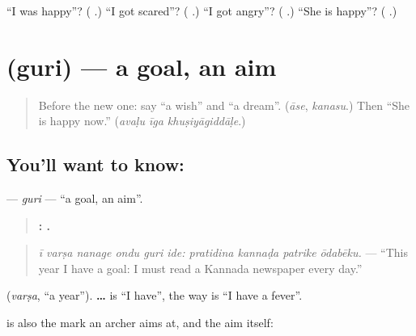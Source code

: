 \begin{tcolorbox}[breakable,colback=teal!4,colframe=teal!35!black,title={Before you move on}]
\textquotedblleft{}I was happy\textquotedblright{}? (\textbf{ }.) \textquotedblleft{}I got scared\textquotedblright{}? (\textbf{ }.) \textquotedblleft{}I got angry\textquotedblright{}? (\textbf{  }.) \textquotedblleft{}She is happy\textquotedblright{}? (\textbf{ }.)
\end{tcolorbox}
\section[\texorpdfstring{\kn{ಗುರಿ} (guri)}{ಗುರಿ (guri)}]{ (guri) — a goal, an aim}

\label{lesson:KA-C315-guri}



\begin{quote}
Before the new one: say \textquotedblleft{}a wish\textquotedblright{} and \textquotedblleft{}a dream\textquotedblright{}. (\emph{āse}, \emph{kanasu}.) Then \textquotedblleft{}She is happy now.\textquotedblright{} (\emph{avaḷu īga khuṣiyāgiddāḷe}.)
\end{quote}

\subsection*{You'll want to know: }
\textbf{} — \emph{guri} — \textquotedblleft{}a goal, an aim\textquotedblright{}.

\begin{quote}
\textbf{     :    .}
\end{quote}

\begin{quote}
\emph{ī varṣa nanage ondu guri ide: pratidina kannaḍa patrike ōdabēku.} — \textquotedblleft{}This year I have a goal: I must read a Kannada newspaper every day.\textquotedblright{}
\end{quote}

\textbf{} (\emph{varṣa}, \textquotedblleft{}a year\textquotedblright{}). \textbf{ … } is \textquotedblleft{}I have\textquotedblright{}, the way \textbf{  } is \textquotedblleft{}I have a fever\textquotedblright{}.

\textbf{} is also the mark an archer aims at, and the aim itself:

